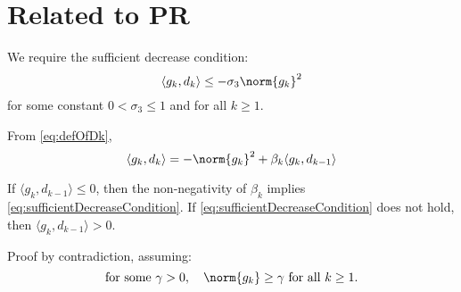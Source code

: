 \documentclass[\main/main]{subfiles}
\begin{document}
\section{Related to PR}

We require the sufficient decrease condition:
\begin{equation}\label{eq:sufficientDecreaseCondition}
    \langle g_k, d_k \rangle \leq - \sigma_3 \norm{g_k}^2
\end{equation}
for some constant $0 < \sigma_3 \leq 1$ and for all $k \geq 1$.

From \eqref{eq:defOfDk},
\begin{equation}
    \langle g_k, d_k \rangle = - \norm{g_k}^2 + \beta_k \langle g_k, d_{k-1} \rangle
\end{equation}

If $\langle g_k, d_{k-1} \rangle \leq 0$, then the non-negativity of $\beta_k$ implies \eqref{eq:sufficientDecreaseCondition}.
If \eqref{eq:sufficientDecreaseCondition} does not hold, then $\langle g_k, d_{k-1} \rangle > 0$.

Proof by contradiction, assuming:
\begin{equation}
    \text{for some } \gamma > 0, \quad \norm{g_k} \geq \gamma \text{ for all } k \geq 1.
\end{equation}
\end{document}
